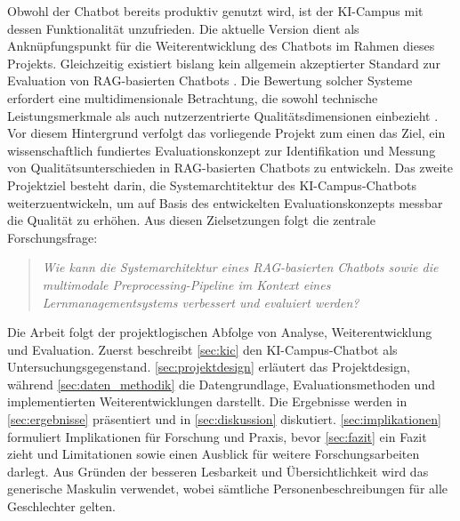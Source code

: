 Obwohl der Chatbot bereits produktiv genutzt wird, ist der KI-Campus mit dessen Funktionalität unzufrieden.
Die aktuelle Version dient als Anknüpfungspunkt für die Weiterentwicklung des Chatbots im Rahmen dieses Projekts.
Gleichzeitig existiert bislang kein allgemein akzeptierter Standard zur Evaluation von RAG-basierten Chatbots \cite{Yu2024RAGEvalSurvey,SwachaGracel2025}.
Die Bewertung solcher Systeme erfordert eine multidimensionale Betrachtung, die sowohl technische Leistungsmerkmale als auch nutzerzentrierte Qualitätsdimensionen einbezieht \cite{Es2023RAGAS,SaadFalcon2024ARES}.
Vor diesem Hintergrund verfolgt das vorliegende Projekt zum einen das Ziel, ein wissenschaftlich fundiertes Evaluationskonzept zur Identifikation und Messung von Qualitätsunterschieden in RAG-basierten Chatbots zu entwickeln.
Das zweite Projektziel besteht darin, die Systemarchtitektur des KI-Campus-Chatbots weiterzuentwickeln, um auf Basis des entwickelten Evaluationskonzepts messbar die Qualität zu erhöhen.
Aus diesen Zielsetzungen folgt die zentrale Forschungsfrage:
\begin{quote}
\textit{Wie kann die Systemarchitektur eines RAG-basierten Chatbots sowie die multimodale Preprocessing-Pipeline im Kontext eines Lernmanagementsystems verbessert und evaluiert werden?}
\end{quote}
Die Arbeit folgt der projektlogischen Abfolge von Analyse, Weiterentwicklung und Evaluation. Zuerst beschreibt \autoref{sec:kic} den KI-Campus-Chatbot als Untersuchungsgegenstand. \autoref{sec:projektdesign} erläutert das Projektdesign, während \autoref{sec:daten_methodik} die Datengrundlage, Evaluationsmethoden und implementierten Weiterentwicklungen darstellt. Die Ergebnisse werden in \autoref{sec:ergebnisse} präsentiert und in \autoref{sec:diskussion} diskutiert. \autoref{sec:implikationen} formuliert Implikationen für Forschung und Praxis, bevor \autoref{sec:fazit} ein Fazit zieht und Limitationen sowie einen Ausblick für weitere Forschungsarbeiten darlegt. Aus Gründen der besseren Lesbarkeit und Übersichtlichkeit wird das generische Maskulin verwendet, wobei sämtliche Personenbeschreibungen für alle Geschlechter gelten.
